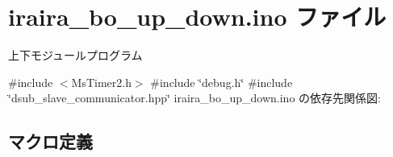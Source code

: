 \hypertarget{iraira__bo__up__down_8ino}{}\section{iraira\+\_\+bo\+\_\+up\+\_\+down.\+ino ファイル}
\label{iraira__bo__up__down_8ino}


上下モジュールプログラム  


{\ttfamily \#include $<$Ms\+Timer2.\+h$>$}\newline
{\ttfamily \#include \char`\"{}debug.\+h\char`\"{}}\newline
{\ttfamily \#include \char`\"{}dsub\+\_\+slave\+\_\+communicator.\+hpp\char`\"{}}\newline
iraira\+\_\+bo\+\_\+up\+\_\+down.\+ino の依存先関係図\+:
\subsection*{マクロ定義}
